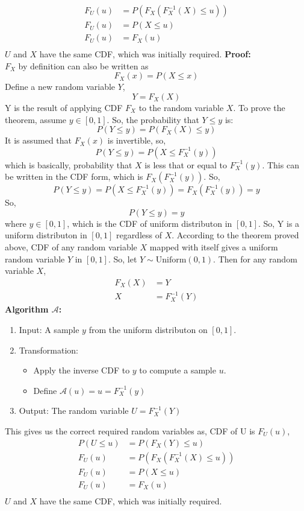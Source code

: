 \begin{solution}
\begin{align}
		F_U(u)      & =  P(F_X(F_X^{-1}(X) \leq u)) \\
		F_U(u)      & =  P(X \leq u)                \\
		F_U(u)      & =  F_X(u)                     \\
	\end{align}
	$U$ and $X$ have the same CDF, which was initially required.
	\textbf{Proof:}\\
	$F_X$ by definition can also be written as
	\[F_X(x) = P(X\leq x)\]
	Define a new random variable $Y$,
	\[Y =F_X(X) \]
	Y is the result of applying CDF $F_X$ to the random variable $X$.
	To prove the theorem, assume $y\in [0,1]$. So, the probability that $Y \leq y$ is:
	\[P(Y\leq y) = P(F_X(X)\leq y)\]
	It is assumed that $F_X(x)$ is invertible, so,
	\[P(Y\leq y) = P(X\leq F_X^{-1}(y))\]
	which is basically, probability that $X$ is less that or equal to $F_X^{-1}(y)$. This can be written in the CDF form, which is $F_X(F_X^{-1}(y))$. So,
	\[P(Y\leq y) = P(X\leq F_X^{-1}(y)) = F_X(F_X^{-1}(y)) = y\]
	So,
	\[P(Y\leq y) = y\]
	where $y\in [0,1]$, which is the CDF of uniform distributon in $[0,1]$.
	So, Y is a uniform distributon in $[0,1]$ regardless of $X$.
	According to the theorem proved above, CDF of any random variable $X$ mapped with itself gives a uniform
	random variable $Y$ in $[0,1]$. So, let $Y\sim \text{Uniform}(0,1)$. Then for any random variable $X$,
	\begin{align}
		F_X(X) & = Y           \\
		X      & = F_X^{-1}(Y)
	\end{align}
	\textbf{Algorithm $\mathcal{A}$:}
	\begin{enumerate}
		\item Input: A sample $y$ from the uniform distributon on $[0,1]$.
		\item Transformation:
		      \begin{itemize}
			      \item Apply the inverse CDF to $y$ to compute a sample $u$.
			      \item Define $\mathcal{A}(u) = u = F_X^{-1}(y)$
		      \end{itemize}
		\item Output: The random variable $U = F_X^{-1}(Y)$
	\end{enumerate}
	This gives us the correct required random variables as, CDF of U is $F_U(u)$,
	\begin{align}
		P(U\leq u ) & = P(F_X(Y) \leq u)            \\
		F_U(u)      & =  P(F_X(F_X^{-1}(X) \leq u)) \\
		F_U(u)      & =  P(X \leq u)                \\
		F_U(u)      & =  F_X(u)                     \\
	\end{align}
	$U$ and $X$ have the same CDF, which was initially required.



\end{solution}
